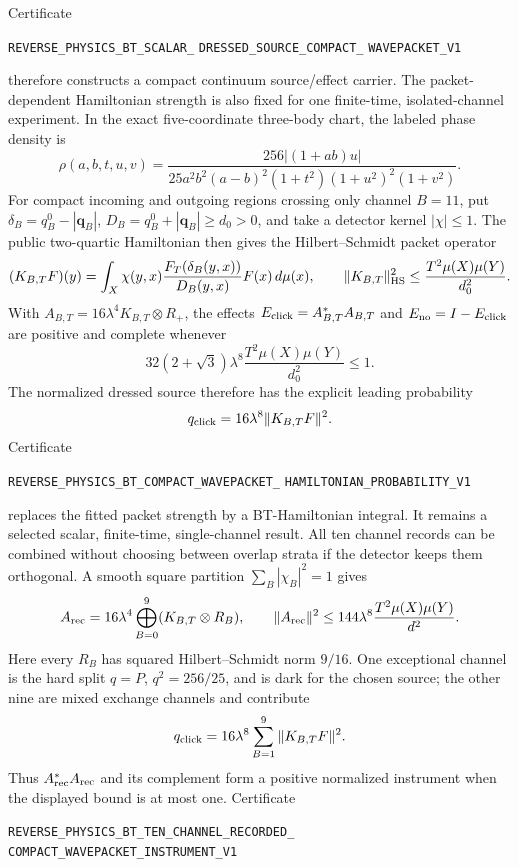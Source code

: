 \documentclass[11pt]{article}
\theoremstyle{definition}
\theoremstyle{remark}
\begin{document}
Certificate
\par\noindent
\texttt{REVERSE\_PHYSICS\_BT\_SCALAR\_}
\allowbreak\texttt{DRESSED\_SOURCE\_COMPACT\_}
\allowbreak\texttt{WAVEPACKET\_V1}
\par\noindent
therefore constructs a compact continuum source/effect carrier.  The
packet-dependent Hamiltonian strength is also fixed for one finite-time,
isolated-channel experiment.  In the exact five-coordinate three-body chart,
the labeled phase density is
\[
 \rho(a,b,t,u,v)=
 \frac{256|(1+ab)u|}
 {25a^2b^2(a-b)^2(1+t^2)(1+u^2)^2(1+v^2)}.
\]
For compact incoming and outgoing regions crossing only channel $B=11$, put
$\delta_B=q_B^0-|\mathbf q_B|$, $D_B=q_B^0+|\mathbf q_B|\geq d_0>0$, and take
a detector kernel $|\chi|\leq1$.  The public two-quartic Hamiltonian then gives
the Hilbert--Schmidt packet operator
\[
 (K_{B,T}F)(y)=\int_X
 \chi(y,x)\frac{F_T(\delta_B(y,x))}{D_B(y,x)}F(x)\,d\mu(x),
 \qquad
 \|K_{B,T}\|_{\rm HS}^2
 \leq\frac{T^2\mu(X)\mu(Y)}{d_0^2}.
\]
With $A_{B,T}=16\lambda^4K_{B,T}\otimes R_+$, the effects
$E_{\rm click}=A_{B,T}^*A_{B,T}$ and
$E_{\rm no}=I-E_{\rm click}$ are positive and complete whenever
\[
 32(2+\sqrt3)\lambda^8
 \frac{T^2\mu(X)\mu(Y)}{d_0^2}\leq1.
\]
The normalized dressed source therefore has the explicit leading probability
\[
 q_{\rm click}=16\lambda^8\|K_{B,T}F\|^2.
\]
Certificate
\par\noindent
\texttt{REVERSE\_PHYSICS\_BT\_COMPACT\_WAVEPACKET\_}
\allowbreak\texttt{HAMILTONIAN\_PROBABILITY\_V1}
\par\noindent
replaces the fitted packet strength by a BT-Hamiltonian integral.  It remains
a selected scalar, finite-time, single-channel result.  All ten channel records
can be combined without choosing between overlap strata if the detector keeps
them orthogonal.  A smooth square partition
$\sum_B|\chi_B|^2=1$ gives
\[
 A_{\rm rec}=16\lambda^4
 \bigoplus_{B=0}^{9}(K_{B,T}\otimes R_B),
 \qquad
 \|A_{\rm rec}\|^2\leq
 144\lambda^8\frac{T^2\mu(X)\mu(Y)}{d^2}.
\]
Here every $R_B$ has squared Hilbert--Schmidt norm $9/16$.  One exceptional
channel is the hard split $q=P$, $q^2=256/25$, and is dark for the chosen
source; the other nine are mixed exchange channels and contribute
\[
 q_{\rm click}=16\lambda^8
 \sum_{B=1}^{9}\|K_{B,T}F\|^2.
\]
Thus $A_{\rm rec}^*A_{\rm rec}$ and its complement form a positive normalized
instrument when the displayed bound is at most one.  Certificate
\par\noindent
\texttt{REVERSE\_PHYSICS\_BT\_TEN\_CHANNEL\_RECORDED\_}
\allowbreak\texttt{COMPACT\_WAVEPACKET\_INSTRUMENT\_V1}
\end{document}

